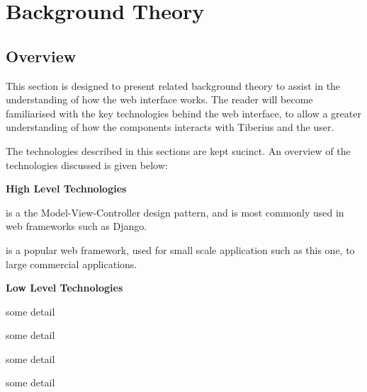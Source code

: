 \section{Background Theory}

\subsection{Overview}
This section is designed to present related background theory to assist in the
understanding of how the web interface works. The reader will become
familiarised with the key technologies behind the web interface, to allow a
greater understanding of how the components interacts with Tiberius and the
user.

The technologies described in this sections are kept sucinct. An overview of
the technologies discussed is given below:

\textbf{High Level Technologies}

\begin{description}[align=left]
\item [MVC] is a the Model-View-Controller design pattern, and is most commonly
used in web frameworks such as Django.

\item [Django] is a popular web framework, used for small scale application
such as this one, to large commercial applications.

\end{description}

\textbf{Low Level Technologies}

\begin{description}[align=left]
\item [HTTP] some detail
\item [TCP] some detail
\item [UDP] some detail
\item [VPN] some detail
\end{description}

